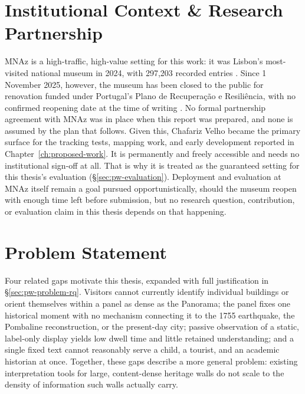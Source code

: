 \section{Institutional Context \& Research Partnership}
\label{sec:intro-institutional}

MNAz is a high-traffic, high-value setting for this work: it was
Lisbon's most-visited national museum in 2024, with 297{,}203 recorded
entries \cite{observador2025mnaz}. Since 1 November 2025, however, the
museum has been closed to the public for renovation funded under
Portugal's Plano de Recupera\c{c}\~{a}o e Resili\^{e}ncia, with no
confirmed reopening date at the time of writing \cite{publico2025prr}.
No formal partnership agreement with MNAz was in place when this report
was prepared, and none is assumed by the plan that follows. Given this,
Chafariz Velho became the primary surface for the tracking tests,
mapping work, and early development reported in
Chapter~\ref{ch:proposed-work}. It is permanently and freely accessible
and needs no institutional sign-off at all. That is why it is
treated as the guaranteed setting for this thesis's evaluation
(\S\ref{sec:pw-evaluation}). Deployment and evaluation at MNAz itself
remain a goal pursued opportunistically, should the museum reopen with
enough time left before submission, but no research question,
contribution, or evaluation claim in this thesis depends on that
happening.

\section{Problem Statement}
\label{sec:intro-problem}

Four related gaps motivate this thesis, expanded with full justification
in \S\ref{sec:pw-problem-rq}. Visitors cannot currently identify
individual buildings or orient themselves within a panel as dense as the
Panorama; the panel fixes one historical moment with no mechanism
connecting it to the 1755 earthquake, the Pombaline reconstruction, or
the present-day city; passive observation of a static, label-only display
yields low dwell time and little retained understanding; and a single
fixed text cannot reasonably serve a child, a tourist, and an academic
historian at once. Together, these gaps describe a more general problem:
existing interpretation tools for large, content-dense heritage walls do
not scale to the density of information such walls actually carry.

